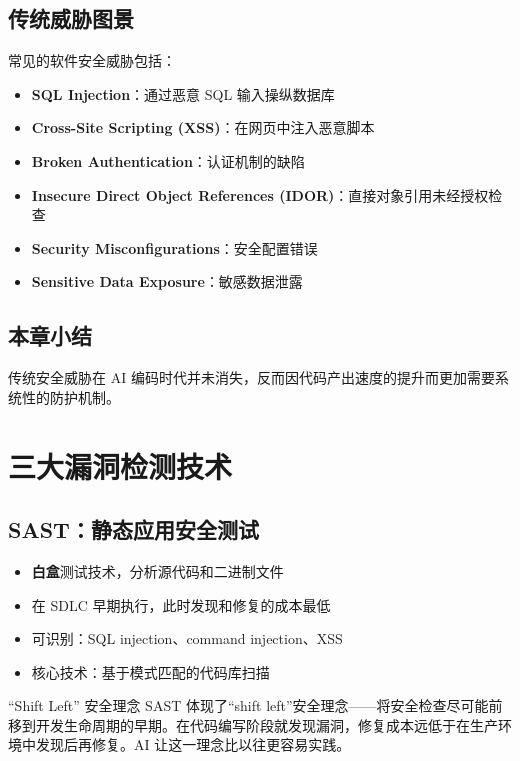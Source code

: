 \documentclass[a4paper]{article}
\begin{document}
\subsection{传统威胁图景}

常见的软件安全威胁包括：
\begin{itemize}
    \item \textbf{SQL Injection}：通过恶意 SQL 输入操纵数据库
    \item \textbf{Cross-Site Scripting (XSS)}：在网页中注入恶意脚本
    \item \textbf{Broken Authentication}：认证机制的缺陷
    \item \textbf{Insecure Direct Object References (IDOR)}：直接对象引用未经授权检查
    \item \textbf{Security Misconfigurations}：安全配置错误
    \item \textbf{Sensitive Data Exposure}：敏感数据泄露
\end{itemize}

\subsection{本章小结}

传统安全威胁在 AI 编码时代并未消失，反而因代码产出速度的提升而更加需要系统性的防护机制。

\section{三大漏洞检测技术}

\subsection{SAST：静态应用安全测试}

\begin{itemize}
    \item \textbf{白盒}测试技术，分析源代码和二进制文件
    \item 在 SDLC 早期执行，此时发现和修复的成本最低
    \item 可识别：SQL injection、command injection、XSS
    \item 核心技术：基于模式匹配的代码库扫描
\end{itemize}

\begin{knowledgebox}{``Shift Left'' 安全理念}
SAST 体现了``shift left''安全理念——将安全检查尽可能前移到开发生命周期的早期。在代码编写阶段就发现漏洞，修复成本远低于在生产环境中发现后再修复。AI 让这一理念比以往更容易实践。
\end{knowledgebox}
\end{document}
